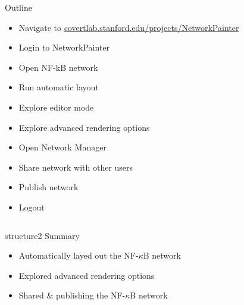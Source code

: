 \documentclass[mathserif]{beamer}
\begin{document}
\begin{frame}{Outline}
\begin{itemize}
\item Navigate to \url{covertlab.stanford.edu/projects/NetworkPainter}
\item Login to NetworkPainter
\item Open NF-kB network
\item Run automatic layout
\item Explore editor mode
\item Explore advanced rendering options
\item Open Network Manager
\item Share network with other users
\item Publish network
\item Logout
\end{itemize}
\end{frame}

\begin{frame}
\begin{columns}
\begin{column}{3.5in}
\begin{center}
\begin{beamercolorbox}[rounded=true,shadow=true,center,sep=0.01cm]{structure2}
\LARGE
Summary
\end{beamercolorbox}
\begin{itemize}
\item Automatically layed out the NF-$\kappa$B network
\item Explored advanced rendering options
\item Shared \& publishing the NF-$\kappa$B network
\end{itemize}
\end{center}
\end{column}
\end{columns}
\end{frame}

\begin{frame}{}
\begin{columns}
\end{columns}
\end{frame}
\end{document}
